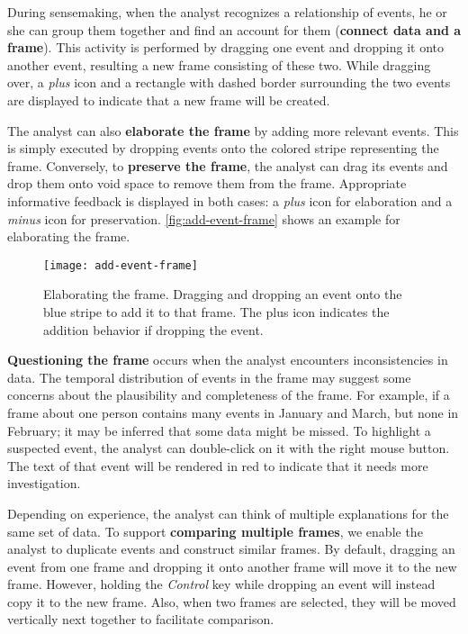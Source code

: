During sensemaking, when the analyst recognizes a relationship of events, he or she can group them together and find an account for them (\textbf{connect data and a frame}). This activity is performed by dragging one event and dropping it onto another event, resulting a new frame consisting of these two. While dragging over, a \emph{plus} icon and a rectangle with dashed border surrounding the two events are displayed to indicate that a new frame will be created. 

The analyst can also \textbf{elaborate the frame} by adding more relevant events. This is simply executed by dropping events onto the colored stripe representing the frame. Conversely, to \textbf{preserve the frame}, the analyst can drag its events and drop them onto void space to remove them from the frame. Appropriate informative feedback is displayed in both cases: a \emph{plus} icon for elaboration and a \emph{minus} icon for preservation. \autoref{fig:add-event-frame} shows an example for elaborating the frame.

\begin{figure}[!htb]
	\centering
	\texttt{[image: add-event-frame]}
	\caption{Elaborating the frame. Dragging and dropping an event onto the blue stripe to add it to that frame. The plus icon indicates the addition behavior if dropping the event.}
	\label{fig:add-event-frame}
\end{figure}

\textbf{Questioning the frame} occurs when the analyst encounters inconsistencies in data. The temporal distribution of events in the frame may suggest some concerns about the plausibility and completeness of the frame. For example, if a frame about one person contains many events in January and March, but none in February; it may be inferred that some data might be missed. To highlight a suspected event, the analyst can double-click on it with the right mouse button. The text of that event will be rendered in red to indicate that it needs more investigation. 

Depending on experience, the analyst can think of multiple explanations for the same set of data. To support \textbf{comparing multiple frames}, we enable the analyst to duplicate events and construct similar frames. By default, dragging an event from one frame and dropping it onto another frame will move it to the new frame. However, holding the \emph{Control} key while dropping an event will instead copy it to the new frame. Also, when two frames are selected, they will be moved vertically next together to facilitate comparison.

